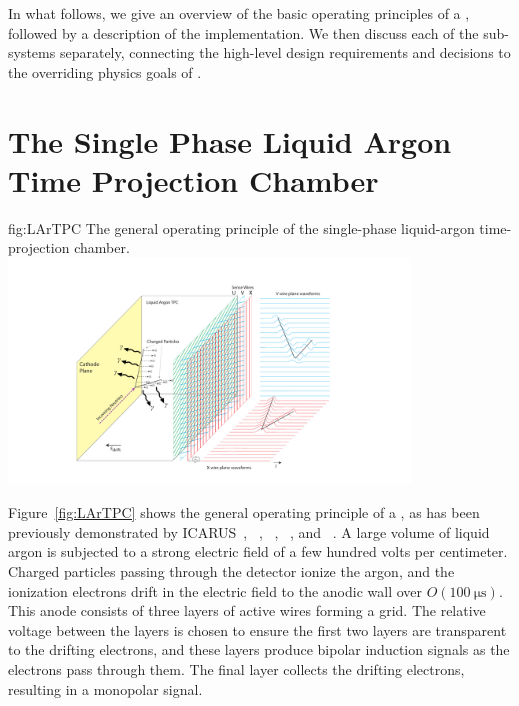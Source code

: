 In what follows, we give an overview of the basic operating principles of a  , followed by a description of the  implementation. We then discuss each of the sub-systems separately, connecting the high-level design requirements and decisions to the overriding physics goals of .

\section{The Single Phase Liquid Argon Time Projection Chamber}
\label{sec:fdsp-exec-splar}

\begin{dunefigure}{fig:LArTPC}
{The general operating principle of the single-phase liquid-argon time-projection chamber.}
\includegraphics[trim={5cm 0 5cm 0},clip,width=0.8\textwidth]{graphics/TheBoPicture.pdf}
\end{dunefigure}

Figure~\ref{fig:LArTPC} shows the general operating principle of a  , as has been previously demonstrated by  ICARUS~\cite{Icarus-T600}, ~\cite{microboone}, ~\cite{Anderson:2012vc}, ~\cite{Cavanna:2014iqa}, and ~\cite{Abi:2017aow}. A large volume of liquid argon is subjected to a strong electric field of a few hundred volts per centimeter. Charged particles passing through the detector ionize the argon, and the ionization electrons drift in the electric field to the anodic wall over $O(\SI{100}{\micro\second})$. This anode consists of three layers of active wires forming a grid. The relative voltage between the layers is chosen to ensure the first two layers are transparent to the drifting electrons, and these layers produce bipolar induction signals as the electrons pass through them. The final layer collects the drifting electrons, resulting in a monopolar signal.

